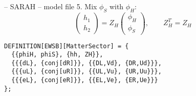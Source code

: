 \documentclass[11pt]{beamer}
\begin{document}

\begin{frame}[fragile]{\insertsection -- SARAH -- model file}
  5. Mix $\phi_S$ with $\phi_H$:
  \begin{equation*}
    \begin{pmatrix}
      h_1 \\ h_2
    \end{pmatrix}
    =
    Z_H
    \begin{pmatrix}
      \phi_H \\ \phi_S
    \end{pmatrix},
    \qquad
    Z_H^T = Z_H
  \end{equation*}
  \begin{lstlisting}
DEFINITION[EWSB][MatterSector] = {
  {{phiH, phiS}, {hh, ZH}},
  {{{dL}, {conj[dR]}}, {{DL,Vd}, {DR,Ud}}},
  {{{uL}, {conj[uR]}}, {{UL,Vu}, {UR,Uu}}},
  {{{eL}, {conj[eR]}}, {{EL,Ve}, {ER,Ue}}}
};\end{lstlisting}
\end{frame}


\end{document}
